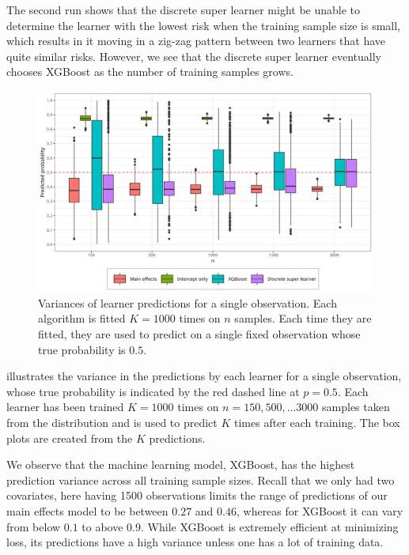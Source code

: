 \documentclass[./main.tex]{subfiles}
\begin{document}
The second run shows that the discrete super learner might be unable to determine the learner with the lowest risk when the training sample size is small, which results in it moving in a zig-zag pattern between two learners that have quite similar risks. However, we see that the discrete super learner eventually chooses XGBoost as the number of training samples grows.  

\begin{figure}[H]
    \centering
    \includegraphics[width=\textwidth]{figures/learner_vars.png}
    \caption{Variances of learner predictions for a single observation. Each algorithm is fitted $ K = 1000 $ times on $n$ samples. Each time they are fitted, they are used to predict on a single fixed observation whose true probability is $ 0.5 $.}
    \label{fig:pred_probs_boxplot}
\end{figure}
 illustrates the variance in the predictions by each learner for a single observation, whose true probability is indicated by the red dashed line at $ p = 0.5 $. Each learner has been trained $ K = 1000 $ times on $ n = 150, 500, \dots 3000 $ samples taken from the distribution and is used to predict $ K $ times after each training. The box plots are created from the $ K $ predictions. 

We observe that the machine learning model, XGBoost, has the highest prediction variance across all training sample sizes. Recall that we only had two covariates, here having 1500 observations limits the range of predictions of our main effects model to be between $ 0.27 $ and $ 0.46 $, whereas for XGBoost it can vary from below $ 0.1 $ to above $ 0.9 $. While XGBoost is extremely efficient at minimizing loss, its predictions have a high variance unless one has a lot of training data.
\end{document}
